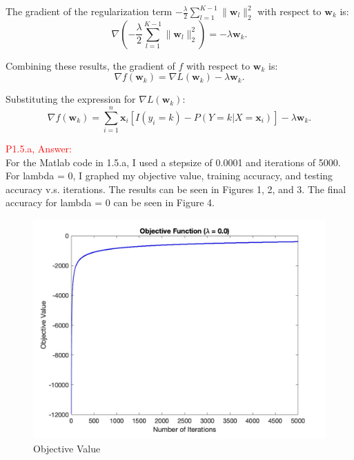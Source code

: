 \documentclass[11pt]{article}
\begin{document}
The gradient of the regularization term \( -\frac{\lambda}{2} \sum_{l=1}^{K-1} \|\mathbf{w}_l\|_2^2 \) with respect to \( \mathbf{w}_k \) is:
\[
\nabla \left( -\frac{\lambda}{2} \sum_{l=1}^{K-1} \|\mathbf{w}_l\|_2^2 \right) = -\lambda \mathbf{w}_k.
\]

Combining these results, the gradient of \( f \) with respect to \( \mathbf{w}_k \) is:
\[
\nabla f(\mathbf{w}_k) = \nabla L(\mathbf{w}_k) - \lambda \mathbf{w}_k.
\]

Substituting the expression for \( \nabla L(\mathbf{w}_k) \):
\[
\nabla f(\mathbf{w}_k) = \sum_{i=1}^n \mathbf{x}_i \left[ I(y_i = k) - P(Y = k | X = \mathbf{x}_i) \right] - \lambda \mathbf{w}_k.
\]


\textcolor{red}{P1.5.a, Answer:}\\

For the Matlab code in 1.5.a, I used a stepsize of 0.0001 and iterations of 5000.
For lambda = 0, I graphed my objective value, training accuracy, and testing accuracy v.s. iterations. 
The results can be seen in Figures 1, 2, and 3. The final accuracy for lambda = 0 can be seen in Figure 4.\\

\begin{figure}[h]
    \centering
    \includegraphics[width=0.95\linewidth]{objective_lambda_0.0.jpg}
    \caption{Objective Value}
    \label{fig:objective}
\end{figure}
\end{document}
